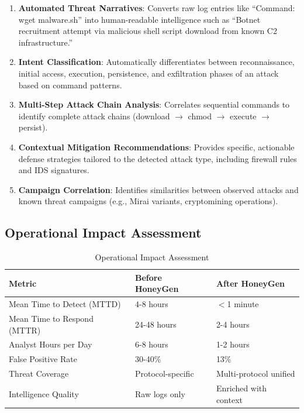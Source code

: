 \documentclass[12pt,a4paper]{report}
\begin{document}
\begin{enumerate}
\item \textbf{Automated Threat Narratives}: Converts raw log entries like ``Command: wget malware.sh'' into human-readable intelligence such as ``Botnet recruitment attempt via malicious shell script download from known C2 infrastructure.''

\item \textbf{Intent Classification}: Automatically differentiates between reconnaissance, initial access, execution, persistence, and exfiltration phases of an attack based on command patterns.

\item \textbf{Multi-Step Attack Chain Analysis}: Correlates sequential commands to identify complete attack chains (download $\rightarrow$ chmod $\rightarrow$ execute $\rightarrow$ persist).

\item \textbf{Contextual Mitigation Recommendations}: Provides specific, actionable defense strategies tailored to the detected attack type, including firewall rules and IDS signatures.

\item \textbf{Campaign Correlation}: Identifies similarities between observed attacks and known threat campaigns (e.g., Mirai variants, cryptomining operations).
\end{enumerate}

\subsection{Operational Impact Assessment}

\begin{table}[h]
\centering
\caption{Operational Impact Assessment}
\label{tab:operational_impact}
\begin{tabular}{|p{4cm}|p{4cm}|p{4cm}|}
\hline
\textbf{Metric} & \textbf{Before HoneyGen} & \textbf{After HoneyGen} \\
\hline
Mean Time to Detect (MTTD) & 4-8 hours & $<$1 minute \\
\hline
Mean Time to Respond (MTTR) & 24-48 hours & 2-4 hours \\
\hline
Analyst Hours per Day & 6-8 hours & 1-2 hours \\
\hline
False Positive Rate & 30-40\% & 13\% \\
\hline
Threat Coverage & Protocol-specific & Multi-protocol unified \\
\hline
Intelligence Quality & Raw logs only & Enriched with context \\
\hline
\end{tabular}
\end{table}
\end{document}
